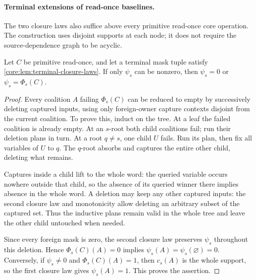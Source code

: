 \paragraph{Terminal extensions of read-once baselines.}
The two closure laws also suffice above every primitive read-once core
operation. The construction uses disjoint supports at each node; it does
not require the source-dependence graph to be acyclic.

\begin{lemma}\label{core:lem:read-once-single-mask}
Let $C$ be primitive read-once, and let a terminal mask tuple satisfy
\cref{core:lem:terminal-closure-laws}. If only $\psi_s$ can be nonzero,
then $\psi_s=0$ or $\psi_s=\Phi_s(C)$.
\end{lemma}
\begin{proof}
Every coalition $A$ failing $\Phi_s(C)$ can be reduced to empty by
successively deleting captured inputs, using only foreign-owner capture
contexts disjoint from the current coalition. To prove this, induct on
the tree. At a leaf the failed coalition is already empty. At an
$s$-root both child coalitions fail; run their deletion plans in turn.
At a root $q\ne s$, one child $U$ fails. Run its plan, then fix all
variables of $U$ to $q$. The $q$-root absorbs and captures the entire
other child, deleting what remains.

Captures inside a child lift to the whole word: the queried variable
occurs nowhere outside that child, so the absence of its queried winner
there implies absence in the whole word. A deletion may keep any other
captured inputs: the second closure law and monotonicity allow deleting
an arbitrary subset of the captured set. Thus the inductive plans remain
valid in the whole tree and leave the other child untouched when needed.

Since every foreign mask is zero, the second closure law preserves
$\psi_s$ throughout this deletion. Hence
$\Phi_s(C)(A)=0$ implies $\psi_s(A)=\psi_s(\varnothing)=0$.
Conversely, if $\psi_s\ne0$ and $\Phi_s(C)(A)=1$, then
$c_s(A)$ is the whole support, so the first closure law gives
$\psi_s(A)=1$. This proves the assertion.
\end{proof}

